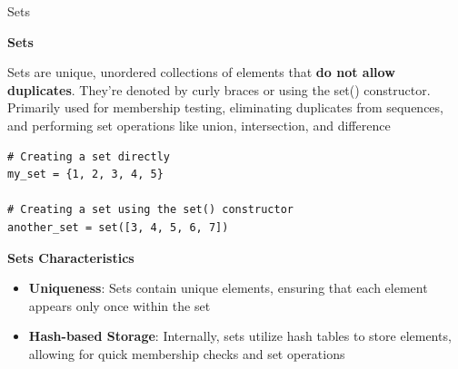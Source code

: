 \documentclass[
	11pt, 
]{beamer}
\begin{document}
\begin{frame}[fragile]{Sets}
\scriptsize
    
\begin{block}{\textbf{Sets}}
    
Sets are unique, unordered collections of elements that \textbf{do not allow duplicates}. They're denoted by curly braces {} or using the set() constructor. Primarily used for membership testing, eliminating duplicates from sequences, and performing set operations like union, intersection, and difference

\end{block}
\begin{verbatim}
# Creating a set directly
my_set = {1, 2, 3, 4, 5}

# Creating a set using the set() constructor
another_set = set([3, 4, 5, 6, 7]) \end{verbatim}

\begin{exampleblock}{\textbf{Sets Characteristics}}
    \begin{itemize}
        \item \textbf{Uniqueness}: Sets contain unique elements, ensuring that each element appears only once within the set
        \item \textbf{Hash-based Storage}: Internally, sets utilize hash tables to store elements, allowing for quick membership checks and set operations
    \end{itemize}    
\end{exampleblock}


\end{frame}



\end{document}

